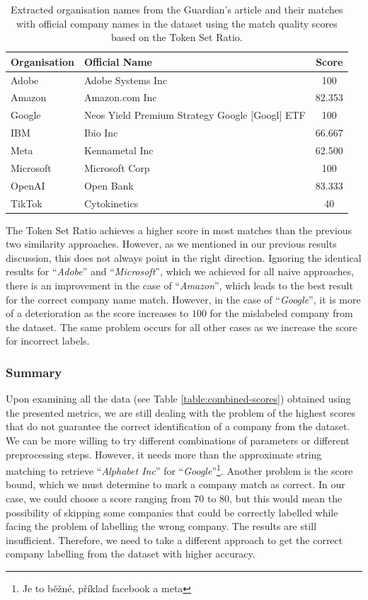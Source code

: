 \begin{table}[ht]
    \centering
    \caption{Extracted organisation names from the Guardian's article and their matches with official company names in the dataset using the match quality scores based on the Token Set Ratio.}
    \label{table:token-set-ratio}
    \begin{tabular}{l l c}
        \hline
        Organisation & Official Name & Score \\
        \hline
        Adobe & Adobe Systems Inc & 100 \\
        Amazon & Amazon.com Inc & 82.353 \\
        Google & Neos Yield Premium Strategy Google [Googl] ETF & 100 \\
        IBM & Ibio Inc & 66.667 \\
        Meta & Kennametal Inc & 62.500 \\
        Microsoft & Microsoft Corp & 100 \\
        OpenAI & Open Bank & 83.333 \\
        TikTok & Cytokinetics & 40 \\
        \hline
    \end{tabular}
\end{table}

The Token Set Ratio achieves a higher score in most matches than the previous two similarity approaches. However, as we mentioned in our previous results discussion, this does not always point in the right direction. Ignoring the identical results for ``\textit{Adobe}'' and ``\textit{Microsoft}'', which we achieved for all naive approaches, there is an improvement in the case of ``\textit{Amazon}'', which leads to the best result for the correct company name match. However, in the case of ``\textit{Google}'', it is more of a deterioration as the score increases to $100$ for the mislabeled company from the dataset. The same problem occurs for all other cases as we increase the score for incorrect labels.

\subsubsection*{Summary}
\label{subsubsec:naive-approach-summary}
Upon examining all the data (see Table \ref{table:combined-scores}) obtained using the presented metrics, we are still dealing with the problem of the highest scores that do not guarantee the correct identification of a company from the dataset. We can be more willing to try different combinations of parameters or different preprocessing steps. However, it needs more than the approximate string matching to retrieve ``\textit{Alphabet Inc}'' for ``\textit{Google}''\footnote{Je to běžné, příklad facebook a meta}. Another problem is the score bound, which we must determine to mark a company match as correct. In our case, we could choose a score ranging from $70$ to $80$, but this would mean the possibility of skipping some companies that could be correctly labelled while facing the problem of labelling the wrong company. The results are still insufficient. Therefore, we need to take a different approach to get the correct company labelling from the dataset with higher accuracy.

